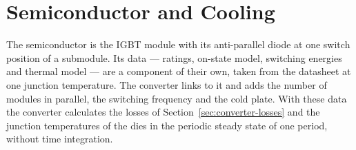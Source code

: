 \section{Semiconductor and Cooling}
\label{sec:thermal}

The semiconductor is the IGBT module with its anti-parallel diode at one switch position of a submodule. Its data
--- ratings, on-state model, switching energies and thermal model --- are a component of their own, taken from the
datasheet at one junction temperature. The converter links to it and adds the number of modules in parallel, the
switching frequency and the cold plate. With these data the converter calculates the losses of
Section~\ref{sec:converter-losses} and the junction temperatures of the dies in the periodic steady state of one
period, without time integration.






